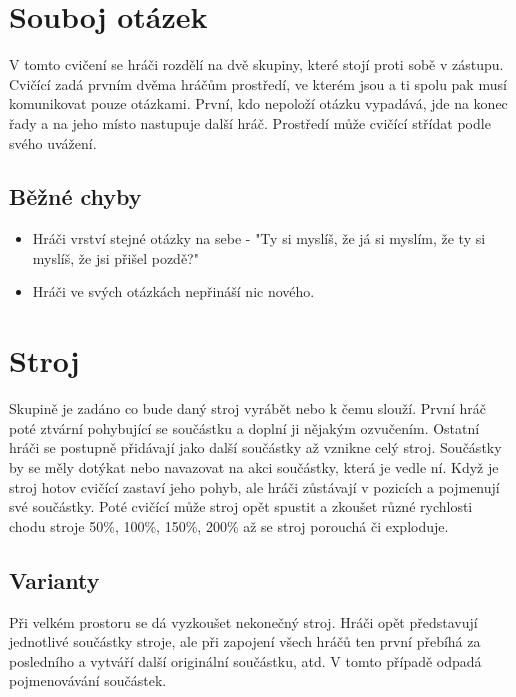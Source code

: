  
 
 
 
\needspace{5cm} \section{Souboj otázek} \label{souboj otázek} V tomto cvičení se hráči rozdělí na dvě skupiny, které stojí proti sobě v zástupu. Cvičící zadá prvním dvěma hráčům prostředí, ve kterém jsou a ti spolu pak musí komunikovat pouze otázkami. První, kdo nepoloží otázku vypadává, jde na konec řady a na jeho místo nastupuje další hráč. Prostředí může cvičící střídat podle svého uvážení. 
 
\subsection{ Běžné chyby } \begin{itemize}
\item Hráči vrství stejné otázky na sebe - "Ty si myslíš, že já si myslím, že ty si myslíš, že jsi přišel pozdě?"
\item Hráči ve svých otázkách nepřináší nic nového.
\end{itemize}
 
  
 
 
 
\needspace{5cm} \section{Stroj} \label{stroj} Skupině je zadáno co bude daný stroj vyrábět nebo k čemu slouží. První hráč poté ztvární pohybující se součástku a doplní ji nějakým ozvučením. Ostatní hráči se postupně přidávají jako další součástky až vznikne celý stroj. Součástky by se měly dotýkat nebo navazovat na akci součástky, která je vedle ní. Když je stroj hotov cvičící zastaví jeho pohyb, ale hráči zůstávají v pozicích a pojmenují své součástky. Poté cvičící může stroj opět spustit a zkoušet různé rychlosti chodu stroje 50\%{}, 100\%{}, 150\%{}, 200\%{} až se stroj porouchá či exploduje. 
 
\subsection{ Varianty } Při velkém prostoru se dá vyzkoušet nekonečný stroj. Hráči opět představují jednotlivé součástky stroje, ale při zapojení všech hráčů ten první přebíhá za posledního a vytváří další originální součástku, atd. V tomto případě odpadá pojmenovávání součástek. 
 
